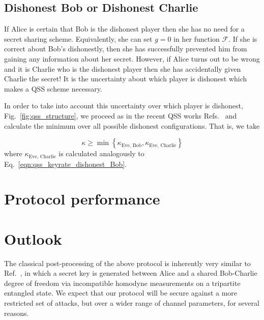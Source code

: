 \subsection{Dishonest Bob or Dishonest Charlie}
If Alice is certain that Bob is the dishonest player then she has no need for a secret sharing scheme. Equivalently, she can set $g=0$ in her function $\mathcal{F}$. If she is correct about Bob's dishonestly, then she has successfully prevented him from gaining any information about her secret. However, if Alice turns out to be wrong and it is Charlie who is the dishonest player then she has accidentally given Charlie the secret! It is the uncertainty about which player is dishonest which makes a QSS scheme necessary.

In order to take into account this uncertainty over which player is dishonest, Fig.~\ref{fig:qss_structure}, we proceed as in the recent QSS works Refs.~\cite{Kogias2017, Grice2019} and calculate the minimum over all possible dishonest configurations. That is, we take

\begin{equation}
\kappa \ge \min \left\{\kappa_{\text{Eve, Bob}}, \kappa_{\text{Eve, Charlie}}\right\}
\end{equation}
where $\kappa_{\text{Eve, Charlie}}$ is calculated analogously to Eq.~\ref{eqn:qss_keyrate_dishonest_Bob}. 


\section{Protocol performance}


















\section{Outlook}
The classical post-processing of the above protocol is inherently very similar to Ref.~\cite{Kogias2017}, in which a secret key is generated between Alice and a shared Bob-Charlie degree of freedom via incompatible homodyne measurements on a tripartite entangled state. We expect that our protocol will be secure against a more restricted set of attacks, but over a wider range of channel parameters, for several reasons. 

